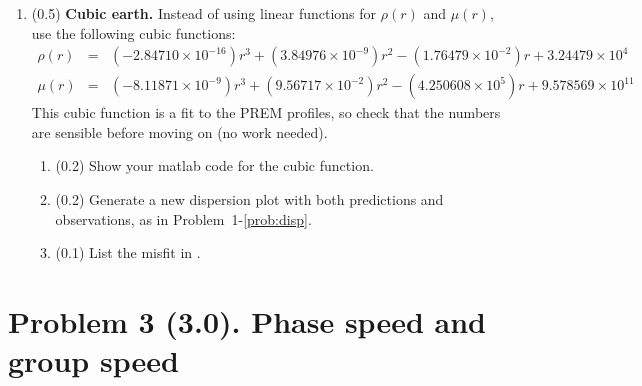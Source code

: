 \documentclass[11pt,titlepage,fleqn]{article}
\begin{document}
\begin{enumerate}
\item (0.5) {\bf Cubic earth.} Instead of using linear functions for $\rho(r)$ and $\mu(r)$, use the following cubic functions:
%
\begin{eqnarray*}
\rho(r) &=& (-2.84710 \times 10^{-16})r^3 + (3.84976 \times 10^{-9})r^2 - (1.76479 \times 10^{-2})r + 3.24479 \times 10^{4}
\\
\mu(r) &=& (-8.11871 \times 10^{-9}) r^3 + (9.56717 \times 10^{-2})r^2 - (4.250608 \times 10^{5})r + 9.578569 \times 10^{11}
\end{eqnarray*}
%
%
This cubic function is a fit to the PREM profiles, so check that the numbers are sensible before moving on (no work needed).

\begin{enumerate}
\item (0.2) Show your matlab code for the cubic function.
\item (0.2) Generate a new dispersion plot with both predictions and observations, as in Problem~1-\ref{prob:disp}.
\item (0.1) List the misfit in .
\end{enumerate}

\label{prob:earth_cubic}

%


\end{enumerate}


\pagebreak
\section*{Problem 3 (3.0). Phase speed and group speed}
\end{document}
